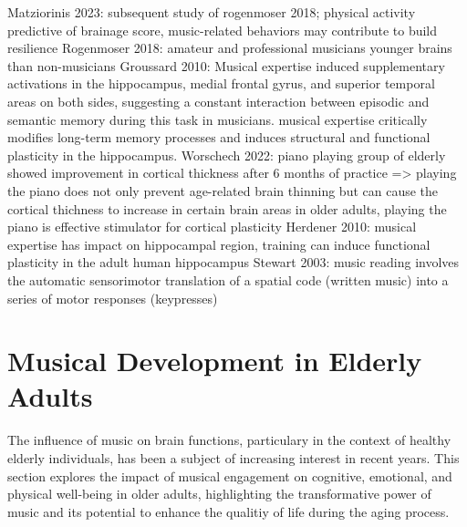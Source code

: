 Matziorinis 2023: subsequent study of rogenmoser 2018; physical activity predictive of brainage score, music-related behaviors may contribute to build resilience
Rogenmoser 2018: amateur and professional musicians younger brains than non-musicians
Groussard 2010: Musical expertise induced supplementary activations in the hippocampus, medial frontal gyrus, and superior temporal areas on both sides, suggesting a constant interaction between episodic and semantic memory during this task in musicians.  musical expertise critically modifies long-term memory processes and induces structural and functional plasticity in the hippocampus. 
Worschech 2022: piano playing group of elderly showed improvement in cortical thickness after 6 months of practice => playing the piano does not only prevent age-related brain thinning but can cause the cortical thichness to increase in certain brain areas in older adults, playing the piano is effective stimulator for cortical plasticity 
Herdener 2010: musical expertise has impact on hippocampal region, training can induce functional plasticity in the adult human hippocampus
Stewart 2003: music reading involves the automatic sensorimotor translation of a spatial code (written music) into a series of motor responses (keypresses)

\section{Musical Development in Elderly Adults}

The influence of music on brain functions, particulary in the context of healthy elderly individuals, has been a subject of increasing interest in recent years. This section explores the impact of musical engagement on cognitive, emotional, and physical well-being in older adults, highlighting the transformative power of music and its potential to enhance the qualitiy of life during the aging process.

